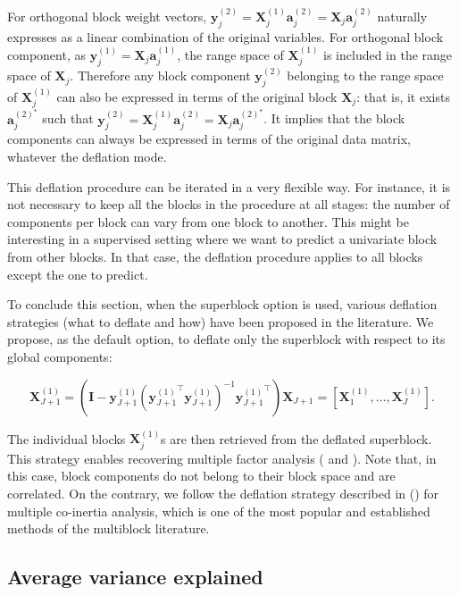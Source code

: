 \documentclass[
]{jss}
\begin{document}
For orthogonal block weight vectors,
\(\mathbf y_j^{(2)} = \mathbf X_j^{(1)} \mathbf a_j^{(2)} = \mathbf X_j  \mathbf a_j^{(2)}\)
naturally expresses as a linear combination of the original variables.
For orthogonal block component, as
\(\mathbf y_j^{(1)} = \mathbf X_j \mathbf a_j^{(1)}\), the range space
of \(\mathbf X_j^{(1)}\) is included in the range space of
\(\mathbf X_j\). Therefore any block component \(\mathbf y_j^{(2)}\)
belonging to the range space of \(\mathbf X_j^{(1)}\) can also be
expressed in terms of the original block \(\mathbf X_j\): that is, it
exists \(\mathbf a_j^{(2)^\star}\) such that
\(\mathbf y_j^{(2)} = \mathbf X_j^{(1)} \mathbf a_j^{(2)} = \mathbf X_j \mathbf a_j^{(2)^\star}\).
It implies that the block components can always be expressed in terms of
the original data matrix, whatever the deflation mode.

This deflation procedure can be iterated in a very flexible way. For
instance, it is not necessary to keep all the blocks in the procedure at
all stages: the number of components per block can vary from one block
to another. This might be interesting in a supervised setting where we
want to predict a univariate block from other blocks. In that case, the
deflation procedure applies to all blocks except the one to predict.

To conclude this section, when the superblock option is used, various
deflation strategies (what to deflate and how) have been proposed in the
literature. We propose, as the default option, to deflate only the
superblock with respect to its global components:

\[\mathbf X_{J+1}^{(1)} = \left(\mathbf{I} -  \mathbf y_{J+1}^{(1)} \left( { \mathbf y_{J+1}^{(1)}}^\top  \mathbf y_{J+1}^{(1)} \right)^{-1}{ \mathbf y_{J+1}^{(1)}}^\top \right) \mathbf X_{J+1} = \left[ \mathbf X_1^{(1)}, \ldots, \mathbf X_J^{(1)} \right].\]

The individual blocks \(\mathbf X_j^{(1)}\)s are then retrieved from the
deflated superblock. This strategy enables recovering multiple factor
analysis ( and ). Note that,
in this case, block components do not belong to their block space and
are correlated. On the contrary, we follow the deflation strategy
described in \cite{Chessel1996} () for multiple
co-inertia analysis, which is one of the most popular and established
methods of the multiblock literature.

\subsection{Average variance
explained}\label{average-variance-explained}
\end{document}
